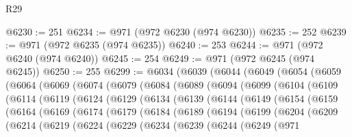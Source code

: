 \begin{lexlean}{R29}
\begin{coremodule}
@6230 := 251
@6234 := @971 (@972 @6230 (@974 @6230))
@6235 := 252
@6239 := @971 (@972 @6235 (@974 @6235))
@6240 := 253
@6244 := @971 (@972 @6240 (@974 @6240))
@6245 := 254
@6249 := @971 (@972 @6245 (@974 @6245))
@6250 := 255
@6299 := @6034
    (@6039
      (@6044
        (@6049
          (@6054
            (@6059
              (@6064
                (@6069
                  (@6074
                    (@6079
                      (@6084
                        (@6089
                          (@6094
                            (@6099
                              (@6104
                                (@6109
                                  (@6114
                                    (@6119
                                      (@6124
                                        (@6129
                                          (@6134
                                            (@6139
                                              (@6144
                                                (@6149
                                                  (@6154
                                                    (@6159
                                                      (@6164
                                                        (@6169
                                                          (@6174
                                                            (@6179
                                                              (@6184
                                                                (@6189
                                                                  (@6194
                                                                    (@6199
                                                                      (@6204
                                                                        (@6209
                                                                          (@6214
                                                                            (@6219
                                                                              (@6224
                                                                                (@6229
                                                                                  (@6234
                                                                                    (@6239
                                                                                      (@6244
                                                                                        (@6249
                                                                                          (@971

\end{coremodule}
\end{lexlean}
